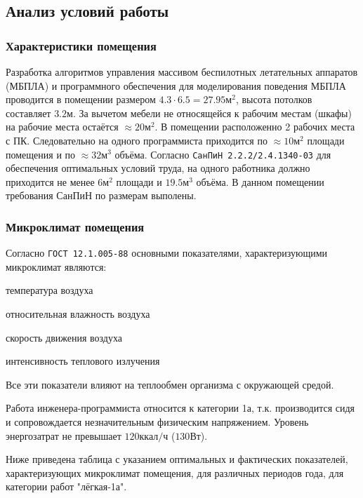 \subsection{Анализ условий работы}

\subsubsection{Характеристики помещения}

Разработка алгоритмов управления массивом беспилотных летательных аппаратов (МБПЛА)
и программного обеспечения для моделирования поведения МБПЛА проводится в помещении
размером $4.3 \cdot 6.5 = 27.95 \text{м}^2$, высота потолков составляет $3.2 \text{м}$.
За вычетом мебели не относящейся к рабочим местам (шкафы) на рабочие места
остаётся $\approx 20 \text{м}^2$. В помещении расположенно 2 рабочих места с ПК.
Следовательно на одного программиста приходится по $\approx 10 \text{м}^2$
площади помещения \lb и по $\approx 32 \text{м}^3$ объёма. Согласно \verb|СанПиН 2.2.2/2.4.1340-03| для
обеспечения оптимальных условий труда, на одного работника должно приходится не менее
$6 \text{м}^2$ площади и $19.5 \text{м}^3$ объёма. В данном помещении требования
СанПиН по размерам выполены.

\subsubsection{Микроклимат помещения}

Согласно \verb|ГОСТ 12.1.005-88| основными показателями,
характеризующими микроклимат являются:
\begin{mintemize}
\item температура воздуха
\item относительная влажность воздуха
\item скорость движения воздуха
\item интенсивность теплового излучения
\end{mintemize}
Все эти показатели влияют на теплообмен организма с окружающей средой.

Работа инженера-программиста относится к категории 1а, т.к. производится
сидя и сопровождается незначительным физическим напряжением. Уровень
энергозатрат не превышает $120 {\text{ккал}}/{\text{ч}}$ ($130 \text{Вт}$).

\newpage

Ниже приведена таблица с указанием оптимальных и фактических показателей,
характеризующих микроклимат помещения, для различных периодов года,
для категории работ "лёгкая-1а".

